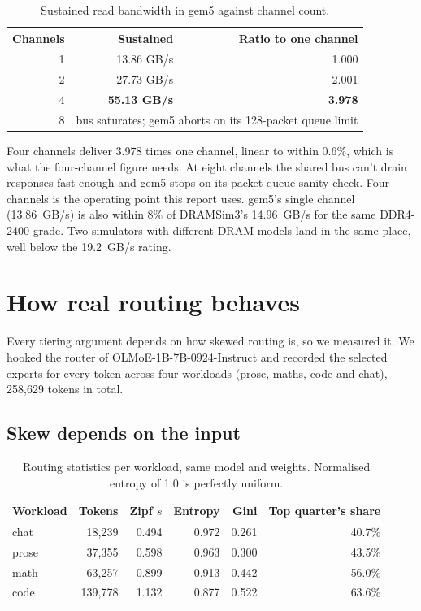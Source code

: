 \documentclass[10pt,a4paper]{article}
\begin{document}
\begin{table}[htbp]
\centering\small
\caption{Sustained read bandwidth in gem5 against channel count.}
\label{tab:channels}
\begin{tabular}{rrr}
\toprule
Channels & Sustained & Ratio to one channel \\
\midrule
1 & 13.86 GB/s & 1.000 \\
2 & 27.73 GB/s & 2.001 \\
4 & \textbf{55.13 GB/s} & \textbf{3.978} \\
8 & \multicolumn{2}{l}{bus saturates; gem5 aborts on its 128-packet queue limit} \\
\bottomrule
\end{tabular}
\end{table}

Four channels deliver 3.978 times one channel, linear to within 0.6\%, which is
what the four-channel figure needs. At eight channels the shared bus can't drain
responses fast enough and gem5 stops on its packet-queue sanity check. Four
channels is the operating point this report uses. gem5's single channel (13.86~GB/s) is also within
8\% of DRAMSim3's 14.96~GB/s for the same DDR4-2400 grade. Two simulators with
different DRAM models land in the same place, well below the 19.2~GB/s rating.

\section{How real routing behaves}
\label{sec:routing}

Every tiering argument depends on how skewed routing is, so we measured it. We
hooked the router of OLMoE-1B-7B-0924-Instruct and recorded the selected experts
for every token across four workloads (prose, maths, code and chat), 258{,}629
tokens in total.

\subsection{Skew depends on the input}

\begin{table}[htbp]
\centering\small
\caption{Routing statistics per workload, same model and weights. Normalised
entropy of 1.0 is perfectly uniform.}
\label{tab:skew}
\begin{tabular}{lrrrrr}
\toprule
Workload & Tokens & Zipf $s$ & Entropy & Gini & Top quarter's share \\
\midrule
chat  & 18{,}239  & 0.494 & 0.972 & 0.261 & 40.7\% \\
prose & 37{,}355  & 0.598 & 0.963 & 0.300 & 43.5\% \\
math  & 63{,}257  & 0.899 & 0.913 & 0.442 & 56.0\% \\
code  & 139{,}778 & 1.132 & 0.877 & 0.522 & 63.6\% \\
\bottomrule
\end{tabular}
\end{table}
\end{document}
